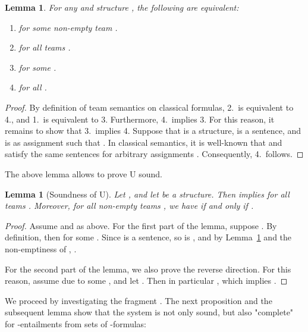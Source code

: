 \documentclass[a4paper,english,fleqn,11pt,final]{scrartcl}
\newcommand{\Deriv}[1]{{\normalfont\textsf{#1}}}
\theoremstyle{plain}
\newtheorem{lemma}[theorem]{Lemma}
\theoremstyle{definition}
\begin{document}
\begin{lemma}\label{lem:sentences}
For any  and structure , the following are equivalent:
\begin{enumerate}
	\item  for some non-empty team .
	\item  for all teams .
	\item  for some .
	\item  for all .
\end{enumerate}
\end{lemma}
\begin{proof}
By definition of team semantics on classical formulas, 2.\ is equivalent to 4., and 1.\ is equivalent to 3.
Furthermore, 4.\ implies 3.
For this reason, it remains to show that 3.\ implies 4.
Suppose that  is a structure,  is a sentence, and  is as assignment such that .
In classical semantics, it is well-known that  and  satisfy the same sentences for arbitrary assignments .
Consequently, 4.\ follows.
\end{proof}

The above lemma allows to prove \Deriv{U} sound.

\begin{lemma}[Soundness of \Deriv{U}]\label{lem:u-soundness}
Let , and let  be a structure.
Then  implies  for all teams .
Moreover, for all non-empty teams , we have  if and only if .
\end{lemma}
\begin{proof}
Assume  and  as above.
For the first part of the lemma, suppose .
By definition, then  for some .
Since  is a sentence, so is , and by Lemma~\ref{lem:sentences} and the non-emptiness of , .

For the second part of the lemma, we also prove the reverse direction.
For this reason, assume  due to some , and let .
Then in particular , which implies .
\end{proof}

We proceed by investigating the fragment .
The next proposition and the subsequent lemma show that the system  is not only sound, but also "complete" for -entailments from sets of -formulas:
\end{document}
